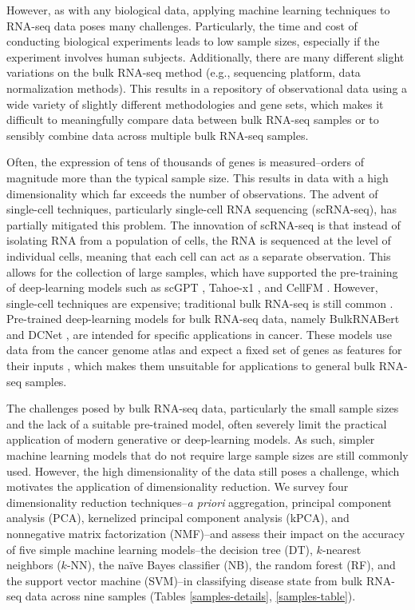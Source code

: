 \documentclass{article}
\begin{document}
However, as with any biological data, applying machine learning techniques to RNA-seq data poses many challenges. Particularly, the time and cost of conducting biological experiments leads to low sample sizes, especially if the experiment involves human subjects. Additionally, there are many different slight variations on the bulk RNA-seq method (e.g., sequencing platform, data normalization methods). This results in a repository of observational data using a wide variety of slightly different methodologies and gene sets, which makes it difficult to meaningfully compare data between bulk RNA-seq samples or to sensibly combine data across multiple bulk RNA-seq samples.

Often, the expression of tens of thousands of genes is measured\---orders of magnitude more than the typical sample size. This results in data with a high dimensionality which far exceeds the number of observations. The advent of single-cell techniques, particularly single-cell RNA sequencing (scRNA-seq), has partially mitigated this problem. The innovation of scRNA-seq is that instead of isolating RNA from a population of cells, the RNA is sequenced at the level of individual cells, meaning that each cell can act as a separate observation. \cite{scRNAseq} This allows for the collection of large samples, which have supported the pre-training of deep-learning models such as scGPT \cite{scGPT}, Tahoe-x1 \cite{TahoeBio}, and CellFM \cite{CellFM}. However, single-cell techniques are expensive; traditional bulk RNA-seq is still common \cite{barriers}. Pre-trained deep-learning models for bulk RNA-seq data, namely BulkRNABert and DCNet \cite{BulkRNABert, DCNet}, are intended for specific applications in cancer. These models use data from the cancer genome atlas and expect a fixed set of genes as features for their inputs \cite{BulkRNABert, DCNet, TCGA}, which makes them unsuitable for applications to general bulk RNA-seq samples.

The challenges posed by bulk RNA-seq data, particularly the small sample sizes and the lack of a suitable pre-trained model, often severely limit the practical application of modern generative or deep-learning models. As such, simpler machine learning models that do not require large sample sizes are still commonly used. However, the high dimensionality of the data still poses a challenge, which motivates the application of dimensionality reduction. We survey four dimensionality reduction techniques\---{\itshape a priori} aggregation, principal component analysis (PCA), kernelized principal component analysis (kPCA), and nonnegative matrix factorization (NMF)\---and assess their impact on the accuracy of five simple machine learning models\---the decision tree (DT), $k$-nearest neighbors ($k$-NN), the na\"ive Bayes classifier (NB), the random forest (RF), and the support vector machine (SVM)\---in classifying disease state from bulk RNA-seq data across nine samples (Tables \ref{samples-details}, \ref{samples-table}).
\end{document}
